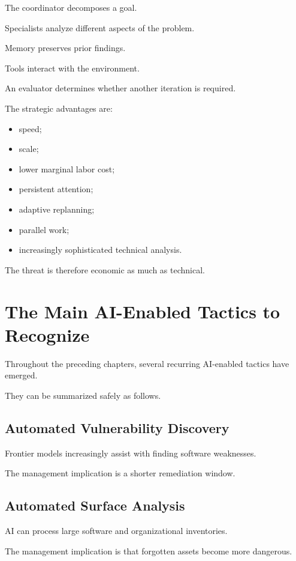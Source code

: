 The coordinator decomposes a goal.

Specialists analyze different aspects of the problem.

Memory preserves prior findings.

Tools interact with the environment.

An evaluator determines whether another iteration is required.

The strategic advantages are:

\begin{itemize}
    \item speed;
    \item scale;
    \item lower marginal labor cost;
    \item persistent attention;
    \item adaptive replanning;
    \item parallel work;
    \item increasingly sophisticated technical analysis.
\end{itemize}

The threat is therefore economic as much as technical.

\section{The Main AI-Enabled Tactics to Recognize}

Throughout the preceding chapters, several recurring AI-enabled tactics have emerged.

They can be summarized safely as follows.

\subsection{Automated Vulnerability Discovery}

Frontier models increasingly assist with finding software weaknesses.

The management implication is a shorter remediation window.

\subsection{Automated Surface Analysis}

AI can process large software and organizational inventories.

The management implication is that forgotten assets become more dangerous.


